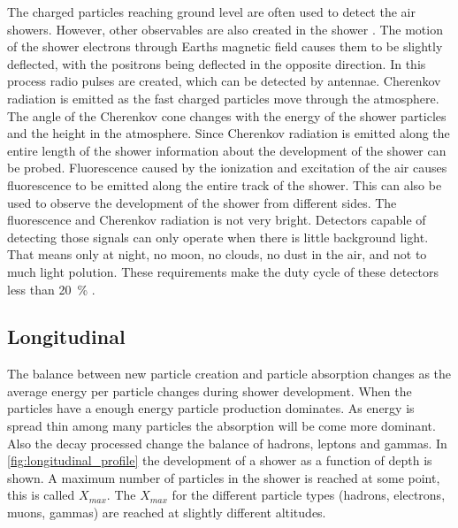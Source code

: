 The charged particles reaching ground level are often used to detect the air showers. However, other observables are also created in the shower \cite{grieder2010eas}. The motion of the shower electrons through Earths magnetic field causes them to be slightly deflected, with the positrons being deflected in the opposite direction. In this process radio pulses are created, which can be detected by antennae. Cherenkov radiation is emitted as the fast charged particles move through the atmosphere. The angle of the Cherenkov cone changes with the energy of the shower particles and the height in the atmosphere. Since Cherenkov radiation is emitted along the entire length of the shower information about the development of the shower can be probed. Fluorescence caused by the ionization and excitation of the air causes fluorescence to be emitted along the entire track of the shower. This can also be used to observe the development of the shower from different sides. The fluorescence and Cherenkov radiation is not very bright. Detectors capable of detecting those signals can only operate when there is little background light. That means only at night, no moon, no clouds, no dust in the air, and not to much light polution. These requirements make the duty cycle of these detectors less than \SI{20}{\percent} \cite{abraham2004auger}.


\subsection{Longitudinal}

The balance between new particle creation and particle absorption changes as the average energy per particle changes during shower development. When the particles have a enough energy particle production dominates. As energy is spread thin among many particles the absorption will be come more dominant. Also the decay processed change the balance of hadrons, leptons and gammas. In \cref{fig:longitudinal_profile} the development of a shower as a function of depth is shown. A maximum number of particles in the shower is reached at some point, this is called $X_{max}$. The $X_{max}$ for the different particle types (hadrons, electrons, muons, gammas) are reached at slightly different altitudes.


